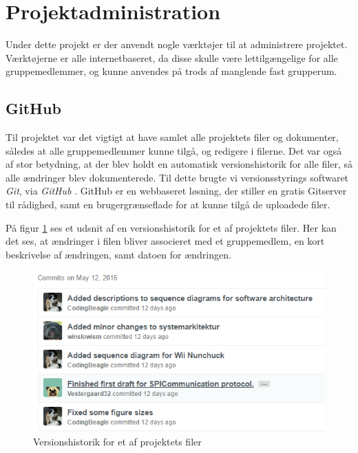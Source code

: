\section{Projektadministration}
Under dette projekt er der anvendt nogle værktøjer til at administrere projektet. Værktøjerne er alle internetbaseret, da disse skulle være lettilgængelige for alle gruppemedlemmer, og kunne anvendes på trods af manglende fast grupperum.

\subsection{GitHub}
Til projektet var det vigtigt at have samlet alle projektets filer og dokumenter, således at alle gruppemedlemmer kunne tilgå, og redigere i filerne. Det var også af stor betydning, at der blev holdt en automatisk versionshistorik for alle filer, så alle ændringer blev dokumenterede. Til dette brugte vi versionsstyrings softwaret \textit{Git}, via \textit{GitHub} \cite{git} \cite{gitRepo}. GitHub er en webbaseret løsning, der stiller en gratis Gitserver til rådighed, samt en brugergrænseflade for at kunne tilgå de uploadede filer. \newline

\noindent På figur \ref{ref:GitHubHistorik} ses et udsnit af en versionshistorik for et af projektets filer. Her kan det ses, at ændringer i filen bliver associeret med et gruppemedlem, en kort beskrivelse af ændringen, samt datoen for ændringen.

\begin{figure}[H]
	\centering
	\includegraphics[width=\textwidth]{Projektgennemfoerelse/images/GitHubHistorik}
	\caption{Versionshistorik for et af projektets filer}
	\label{ref:GitHubHistorik}
\end{figure}

